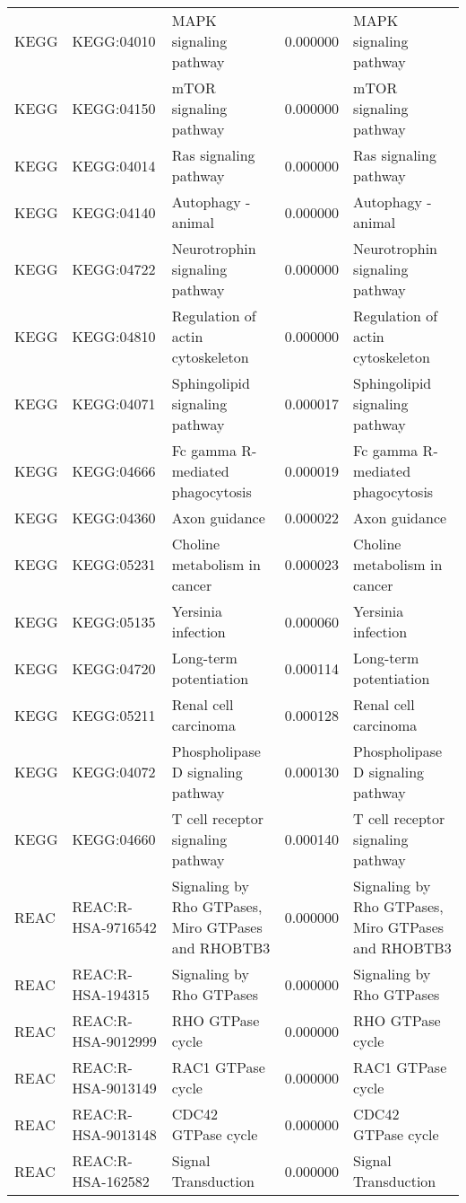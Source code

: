 \begin{tabular}{lllrl}
KEGG & KEGG:04010 & MAPK signaling pathway & 0.000000 & MAPK signaling pathway \\
KEGG & KEGG:04150 & mTOR signaling pathway & 0.000000 & mTOR signaling pathway \\
KEGG & KEGG:04014 & Ras signaling pathway & 0.000000 & Ras signaling pathway \\
KEGG & KEGG:04140 & Autophagy - animal & 0.000000 & Autophagy - animal \\
KEGG & KEGG:04722 & Neurotrophin signaling pathway & 0.000000 & Neurotrophin signaling pathway \\
KEGG & KEGG:04810 & Regulation of actin cytoskeleton & 0.000000 & Regulation of actin cytoskeleton \\
KEGG & KEGG:04071 & Sphingolipid signaling pathway & 0.000017 & Sphingolipid signaling pathway \\
KEGG & KEGG:04666 & Fc gamma R-mediated phagocytosis & 0.000019 & Fc gamma R-mediated phagocytosis \\
KEGG & KEGG:04360 & Axon guidance & 0.000022 & Axon guidance \\
KEGG & KEGG:05231 & Choline metabolism in cancer & 0.000023 & Choline metabolism in cancer \\
KEGG & KEGG:05135 & Yersinia infection & 0.000060 & Yersinia infection \\
KEGG & KEGG:04720 & Long-term potentiation & 0.000114 & Long-term potentiation \\
KEGG & KEGG:05211 & Renal cell carcinoma & 0.000128 & Renal cell carcinoma \\
KEGG & KEGG:04072 & Phospholipase D signaling pathway & 0.000130 & Phospholipase D signaling pathway \\
KEGG & KEGG:04660 & T cell receptor signaling pathway & 0.000140 & T cell receptor signaling pathway \\
REAC & REAC:R-HSA-9716542 & Signaling by Rho GTPases, Miro GTPases and RHOBTB3 & 0.000000 & Signaling by Rho GTPases, Miro GTPases and RHOBTB3 \\
REAC & REAC:R-HSA-194315 & Signaling by Rho GTPases & 0.000000 & Signaling by Rho GTPases \\
REAC & REAC:R-HSA-9012999 & RHO GTPase cycle & 0.000000 & RHO GTPase cycle \\
REAC & REAC:R-HSA-9013149 & RAC1 GTPase cycle & 0.000000 & RAC1 GTPase cycle \\
REAC & REAC:R-HSA-9013148 & CDC42 GTPase cycle & 0.000000 & CDC42 GTPase cycle \\
REAC & REAC:R-HSA-162582 & Signal Transduction & 0.000000 & Signal Transduction \\

\end{tabular}
